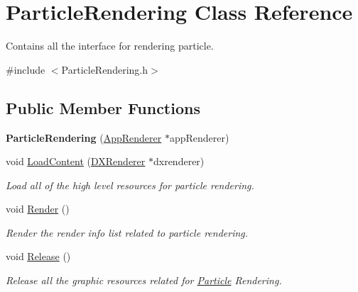 \hypertarget{classParticleRendering}{}\section{Particle\+Rendering Class Reference}
\label{classParticleRendering}


Contains all the interface for rendering particle.  




{\ttfamily \#include $<$Particle\+Rendering.\+h$>$}

\subsection*{Public Member Functions}
\begin{DoxyCompactItemize}
\item 
\mbox{\label{classParticleRendering_a220b3b49f3a4eeef7e4bd711626651d7}} 
{\bfseries Particle\+Rendering} (\hyperlink{classAppRenderer}{App\+Renderer} $\ast$app\+Renderer)
\item 
void \hyperlink{classParticleRendering_a38e0d5b06ee499c355b592c071527a7e}{Load\+Content} (\hyperlink{classDXRenderer}{D\+X\+Renderer} $\ast$dxrenderer)
\begin{DoxyCompactList}\small\item\em Load all of the high level resources for particle rendering. \end{DoxyCompactList}\item 
\mbox{\label{classParticleRendering_adcec4227f9e8223a70fc513dba6eb434}} 
void \hyperlink{classParticleRendering_adcec4227f9e8223a70fc513dba6eb434}{Render} ()
\begin{DoxyCompactList}\small\item\em Render the render info list related to particle rendering. \end{DoxyCompactList}\item 
\mbox{\label{classParticleRendering_ad87f18215d9de1a288b15f96203582c1}} 
void \hyperlink{classParticleRendering_ad87f18215d9de1a288b15f96203582c1}{Release} ()
\begin{DoxyCompactList}\small\item\em Release all the graphic resources related for \hyperlink{structParticle}{Particle} Rendering. \end{DoxyCompactList}\item 

\end{DoxyCompactItemize}
